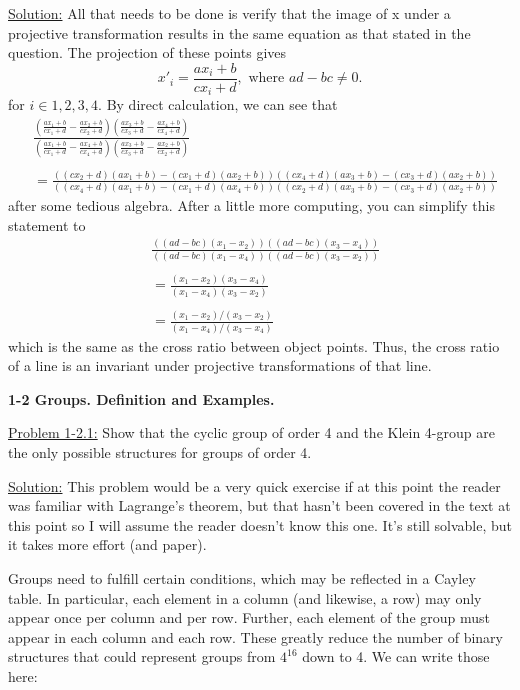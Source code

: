 \documentclass[12pt]{article}
\begin{document}
\underline{Solution:} All that needs to be done is verify that the image of x
under a projective transformation results in the same equation as that stated
in the question. The projection of these points gives
\[
    x'_i = \frac{ax_i+b}{cx_i+d}, \text{ where } ad-bc \neq 0.
\]
for $i \in {1,2,3,4}$. By direct calculation, we can see that
\begin{align*}
    & \frac{\left(\frac{ax_1 + b}{cx_1 + d} - \frac{ax_2 + b}{cx_2 + d}\right)
    \left( \frac{ax_3 + b}{cx_3 + d} - \frac{ax_4 + b}{cx_4 + d}\right)}
    {\left(\frac{ax_1 + b}{cx_1 + d} - \frac{ax_4 + b}{cx_4 + d}\right)    
    \left( \frac{ax_3 + b}{cx_3 + d} - \frac{ax_2 + b}{cx_2 + d}\right)}\\
    \\
    &=
    \frac{((cx_2+d)(ax_1+b)-(cx_1+d)(ax_2+b))((cx_4+d)(ax_3+b)-(cx_3+d)(ax_2+b))}
      {((cx_4+d)(ax_1+b)-(cx_1+d)(ax_4+b))((cx_2+d)(ax_3+b)-(cx_3+d)(ax_2+b))}
\end{align*}
after some tedious algebra. After a little more computing, you can simplify
this statement to
\begin{align*}
    & \frac{((ad-bc)(x_1-x_2))((ad-bc)(x_3-x_4))}{((ad-bc)(x_1-x_4))((ad-bc)(x_3-x_2))}\\
    \\
    & = \frac{(x_1 - x_2)(x_3 - x_4)}{(x_1-x_4)(x_3-x_2)}\\
    \\
    & = \frac{(x_1 - x_2)/(x_3 - x_2)}{(x_1-x_4)/(x_3-x_4)}
\end{align*}
which is the same as the cross ratio between object points. Thus, the cross
ratio of a line is an invariant under projective transformations of that line.

\newpage

\textbf{1-2 Groups. Definition and Examples.}

\underline{Problem 1-2.1:} Show that the cyclic group of order 4 and the Klein
4-group are the only possible structures for groups of order 4.

\underline{Solution:} This problem would be a very quick exercise if at this
point the reader was familiar with Lagrange's theorem, but that hasn't been
covered in the text at this point so I will assume the reader doesn't know this
one. It's still solvable, but it takes more effort (and paper).

Groups need to fulfill certain conditions, which may be reflected in a Cayley
table. In particular, each element in a column (and likewise, a row) may only
appear once per column and per row. Further, each element of the group must
appear in each column and each row. These greatly reduce the number of binary
structures that could represent groups from $4^{16}$ down to 4. We can write
those here:
\end{document}
